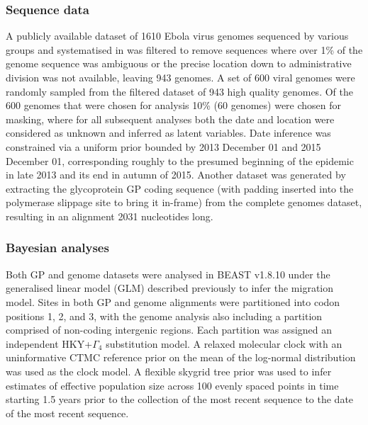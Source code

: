 \documentclass{bmcart}
\begin{document}
\subsubsection*{Sequence data}
A publicly available dataset of 1610 Ebola virus genomes sequenced by various groups \cite{baize_emergence_2014,gire_genomic_2014,park_ebola_2015,carroll_temporal_2015,kugelman_monitoring_2015,ladner_evolution_2015,simon-loriere_distinct_2015,tong_genetic_2015,arias_rapid_2016,smits_genotypic_2015,quick_rapid_2015} and systematised in \cite{dudas_virus_2017} was filtered to remove sequences where over 1\% of the genome sequence was ambiguous or the precise location down to administrative division was not available, leaving 943 genomes.
A set of 600 viral genomes were randomly sampled from the filtered dataset of 943 high quality genomes.
Of the 600 genomes that were chosen for analysis 10\% (60 genomes) were chosen for masking, where for all subsequent analyses both the date and location were considered as unknown and inferred as latent variables.
Date inference was constrained via a uniform prior bounded by 2013 December 01 and 2015 December 01, corresponding roughly to the presumed beginning of the epidemic in late 2013 and its end in autumn of 2015.
Another dataset was generated by extracting the glycoprotein GP coding sequence (with padding inserted into the polymerase slippage site to bring it in-frame) from the complete genomes dataset, resulting in an alignment 2031 nucleotides long.

\subsubsection*{Bayesian analyses}
Both GP and genome datasets were analysed in BEAST v1.8.10 \cite{suchard_bayesian_2018} under the generalised linear model (GLM) described previously \cite{faria_simultaneously_2013,lemey_unifying_2014,dudas_virus_2017} to infer the migration model.
Sites in both GP and genome alignments were partitioned into codon positions 1, 2, and 3, with the genome analysis also including a partition comprised of non-coding intergenic regions.
Each partition was assigned an independent HKY+$\Gamma_{4}$ \cite{hky_1985,yang_1994} substitution model.
A relaxed molecular clock \cite{drummond_2006} with an uninformative CTMC reference prior on the mean \cite{ferreira_bayesian_nodate} of the log-normal distribution was used as the clock model.
A flexible skygrid tree prior \cite{gill_2013} was used to infer estimates of effective population size across 100 evenly spaced points in time starting 1.5 years prior to the collection of the most recent sequence to the date of the most recent sequence.
\end{document}
